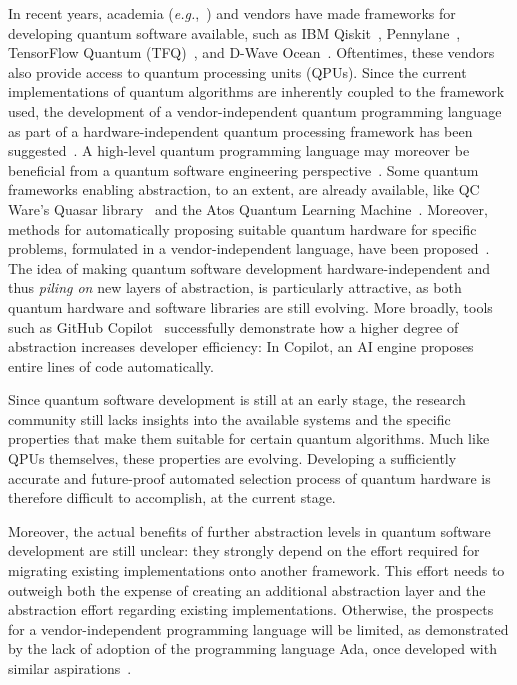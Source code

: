\documentclass[conference]{IEEEtran}
\begin{document}
In recent years, academia (\emph{e.g.},~\cite{Mauerer:2005}) and vendors have made frameworks for
developing quantum software available, such as IBM Qiskit~\cite{Qiskitdoc},
Pennylane~\cite{bergholm2020pennylane}, TensorFlow Quantum (TFQ)~\cite{Broughton.06.03.2020}, and
D-Wave Ocean~\cite{oceansdk}. Oftentimes, these vendors also provide access to quantum processing
units (QPUs). Since the current implementations of quantum algorithms are inherently coupled to the
framework used, the development of a vendor-independent quantum programming language as part of a
hardware-independent quantum processing framework has been suggested~\cite{FrankLeymann.2020}. A
high-level quantum programming language may moreover be beneficial from a quantum software
engineering perspective~\cite{zhao2020quantum,Krueger:2020}. Some quantum frameworks enabling
abstraction, to an
extent, are already available, like QC Ware's Quasar library~\cite{quasar} and the Atos Quantum
Learning Machine~\cite{atosqml}. Moreover, methods for automatically proposing suitable quantum
hardware for specific problems, formulated in a vendor-independent language, have been
proposed~\cite{FrankLeymann.2020, Weder.2021}. The idea of making quantum software development
hardware-independent and thus \emph{piling on} new layers of abstraction, is particularly attractive,
as both quantum hardware and software libraries are still evolving. More broadly, tools such as
GitHub Copilot~\cite{githubcopilot} successfully demonstrate how a higher degree of abstraction
increases developer efficiency: In Copilot, an AI engine proposes entire lines of code automatically.

Since quantum software development is still at an early stage, the research community still lacks
insights into the available systems and the specific properties that make them suitable for certain
quantum algorithms. Much like  QPUs themselves, these properties are evolving. Developing a
sufficiently accurate and future-proof automated selection process of quantum hardware is therefore
difficult to accomplish, at the current stage. 

Moreover, the actual benefits of further abstraction levels in quantum software development are still unclear: they strongly depend on the effort required for migrating existing implementations onto another framework. This effort needs to outweigh both the expense of creating an additional abstraction layer and the abstraction effort regarding existing implementations. Otherwise, the prospects for a vendor-independent programming language will be limited, as demonstrated by the lack of adoption of the programming language Ada, once developed with similar
aspirations~\cite{ichbiah1979rationale}.
\end{document}
